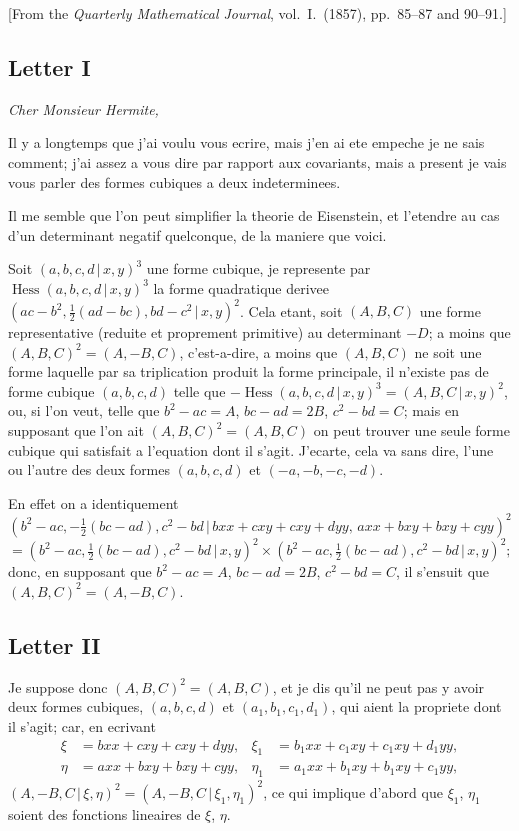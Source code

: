 \documentclass[12pt,a4paper]{article}
\theoremstyle{plain}
\DeclareMathOperator{\Hess}{Hess}
\begin{document}
[From the \textit{Quarterly Mathematical Journal}, vol.~I.\ (1857), pp.~85--87 and 90--91.]

\subsection*{Letter I}

\textit{Cher Monsieur Hermite,}

Il y a longtemps que j'ai voulu vous ecrire, mais j'en ai ete empeche je ne sais comment; j'ai assez a vous dire par rapport aux covariants, mais a present je vais vous parler des formes cubiques a deux indeterminees.

Il me semble que l'on peut simplifier la theorie de Eisenstein, et l'etendre au cas d'un determinant negatif quelconque, de la maniere que voici.

Soit $(a,b,c,d \,|\, x,y)^3$ une forme cubique, je represente par $\Hess(a,b,c,d \,|\, x,y)^3$ la forme quadratique derivee $(ac-b^2, \frac12(ad-bc), bd-c^2 \,|\, x,y)^2$. Cela etant, soit $(A,B,C)$ une forme representative (reduite et proprement primitive) au determinant $-D$; a moins que $(A,B,C)^2 = (A,-B,C)$, c'est-a-dire, a moins que $(A,B,C)$ ne soit une forme laquelle par sa triplication produit la forme principale, il n'existe pas de forme cubique $(a,b,c,d)$ telle que $-\Hess(a,b,c,d \,|\, x,y)^3 = (A,B,C \,|\, x,y)^2$, ou, si l'on veut, telle que $b^2-ac = A$, $bc-ad = 2B$, $c^2-bd = C$; mais en supposant que l'on ait $(A,B,C)^2 = (A,B,C)$ on peut trouver une seule forme cubique qui satisfait a l'equation dont il s'agit. J'ecarte, cela va sans dire, l'une ou l'autre des deux formes $(a,b,c,d)$ et $(-a,-b,-c,-d)$.

En effet on a identiquement
\[
(b^2-ac, -\tfrac12(bc-ad), c^2-bd \,|\, bxx + cxy + cxy + dyy, \, axx + bxy + bxy + cyy)^2
\]
\[
= (b^2-ac, \tfrac12(bc-ad), c^2-bd \,|\, x,y)^2 \times (b^2-ac, \tfrac12(bc-ad), c^2-bd \,|\, x,y)^2;
\]
donc, en supposant que $b^2-ac = A$, $bc-ad = 2B$, $c^2-bd = C$, il s'ensuit que $(A,B,C)^2 = (A,-B,C)$.

\subsection*{Letter II}

Je suppose donc $(A,B,C)^2 = (A,B,C)$, et je dis qu'il ne peut pas y avoir deux formes cubiques, $(a,b,c,d)$ et $(a_1,b_1,c_1,d_1)$, qui aient la propriete dont il s'agit; car, en ecrivant
\begin{align*}
\xi &= bxx + cxy + cxy + dyy, & \xi_1 &= b_1 xx + c_1 xy + c_1 xy + d_1 yy, \\
\eta &= axx + bxy + bxy + cyy, & \eta_1 &= a_1 xx + b_1 xy + b_1 xy + c_1 yy,
\end{align*}
$(A,-B,C \,|\, \xi,\eta)^2 = (A,-B,C \,|\, \xi_1,\eta_1)^2$, ce qui implique d'abord que $\xi_1$, $\eta_1$ soient des fonctions lineaires de $\xi$, $\eta$.
\end{document}
